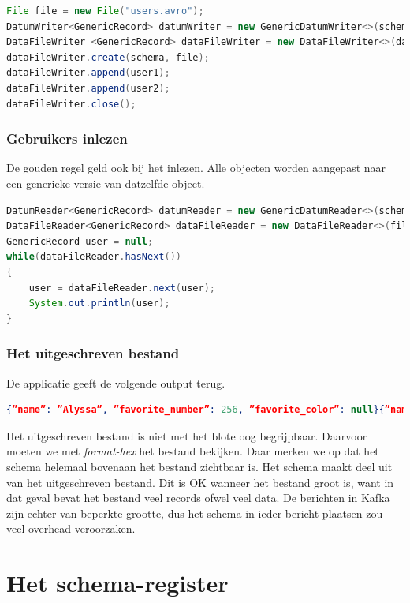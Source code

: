\documentclass[a4paper,10pt,twoside]{report}
\begin{document}
\begin{lstlisting}[language=Java]
File file = new File("users.avro");
DatumWriter<GenericRecord> datumWriter = new GenericDatumWriter<>(schema);
DataFileWriter <GenericRecord> dataFileWriter = new DataFileWriter<>(datumWriter);
dataFileWriter.create(schema, file);
dataFileWriter.append(user1);
dataFileWriter.append(user2);
dataFileWriter.close();
\end{lstlisting}

\subsubsection{Gebruikers inlezen}

De gouden regel geld ook bij het inlezen. Alle objecten worden aangepast naar een generieke versie van datzelfde object.

\begin{lstlisting}[language=Java]
DatumReader<GenericRecord> datumReader = new GenericDatumReader<>(schema);
DataFileReader<GenericRecord> dataFileReader = new DataFileReader<>(file,datumReader);
GenericRecord user = null;
while(dataFileReader.hasNext())
{
	user = dataFileReader.next(user);
	System.out.println(user);
}
\end{lstlisting}

\subsubsection{Het uitgeschreven bestand}

De applicatie geeft de volgende output terug.

\begin{lstlisting}[language=JSON]
{”name”: ”Alyssa”, ”favorite_number”: 256, ”favorite_color”: null}{”name”: ”Ben”, ”favorite_number”: 7, ”favorite_color”: ”red”}
\end{lstlisting}

Het uitgeschreven bestand is niet met het blote oog begrijpbaar. Daarvoor moeten we met \textit{format-hex} het bestand bekijken. Daar merken we op dat het schema helemaal bovenaan het bestand zichtbaar is. Het schema maakt deel uit van het uitgeschreven bestand. Dit is OK wanneer het bestand groot is, want in dat geval bevat het bestand veel records ofwel veel data. De berichten in Kafka zijn echter van beperkte grootte, dus het schema in ieder bericht plaatsen zou veel overhead veroorzaken.

\section{Het schema-register}
\end{document}
